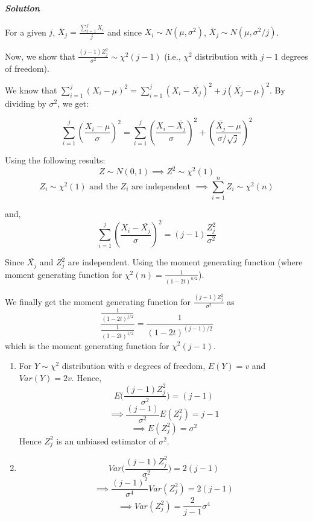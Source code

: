 \documentclass[12pt, oneside]{article}
\begin{document}
\begin{enumerate}
\textit{\textbf{Solution}}

For a given $j$, $\bar X_j = \frac{\sum_{i=1}^{j} X_i}{j}$ and since $X_i \sim N(\mu,\sigma^2)$, $\bar X_j \sim N(\mu,\sigma^2/j)$. 

Now, we show that $\frac{(j-1)Z_j^2}{\sigma^2} \sim \chi^2(j-1)$ (i.e., $\chi^2$ distribution with $j-1$ degrees of freedom).


We know that $\sum_{i=1}^j (X_i - \mu)^2 = \sum_{i=1}^j (X_i - \bar{X_j})^2 + j(\bar{X_j} - \mu)^2$. By dividing by $\sigma^2$, we get:

\[ \sum_{i=1}^j \left(\frac{X_i - \mu}{\sigma}\right)^2 = \sum_{i=1}^j \left(\frac{X_i - \bar{X_j}}{\sigma}\right)^2 +  \left(\frac{\bar{X_j} - \mu}{\sigma/\sqrt{j}}\right)^2 \]

Using the following results:
\[Z \sim N(0,1) \implies Z^2 \sim \chi^2(1)\]
\[Z_i \sim \chi^2(1)\text{ and the }Z_i\text{ are independent }\implies\sum_{i=1}^n Z_i \sim \chi^2(n)\]

and,
\[ \sum_{i=1}^j \left(\frac{X_i - \bar{X_j}}{\sigma}\right)^2 = (j-1)\frac{Z_j^2}{\sigma^2} \]

Since $\bar{X_j}$ and $Z_j^2$ are independent. Using the moment generating function (where moment generating function for $\chi^2(n) = \frac{1}{(1-2t)^{n/2}}$). 

We finally get the moment generating function for $\frac{(j-1)Z_j^2}{\sigma^2}$ as 
\[ \dfrac{ \frac{1}{(1-2t)^{j/2}} }{ \frac{1}{(1-2t)^{1/2}} }= \frac{1}{(1-2t)^{(j-1)/2}}\]
which is the moment generating function for $\chi^2(j-1)$.



\begin{enumerate}
    \item For $Y \sim \chi^2$ distribution with $v$ degrees of freedom, $E(Y) = v$ and $Var(Y) = 2v$. Hence, \[E\bigg(\frac{(j-1)Z_j^2}{\sigma^2}\bigg) = (j-1)\] \[\implies \frac{(j-1)}{\sigma^2} E(Z_j^2) = j-1\] \[\implies E(Z_j^2) = \sigma^2\]
    Hence $Z_j^2$ is an unbiased estimator of $\sigma^2$.
    
    \item \[Var\bigg(\frac{(j-1)Z_j^2}{\sigma^2}\bigg) = 2(j-1)\] \[\implies \frac{(j-1)^2}{\sigma^4} Var(Z_j^2) = 2(j-1)\] \[\implies Var(Z_j^2) = \frac{2}{j-1}\sigma^4\]
    

\end{enumerate}
\end{enumerate}
\end{document}
